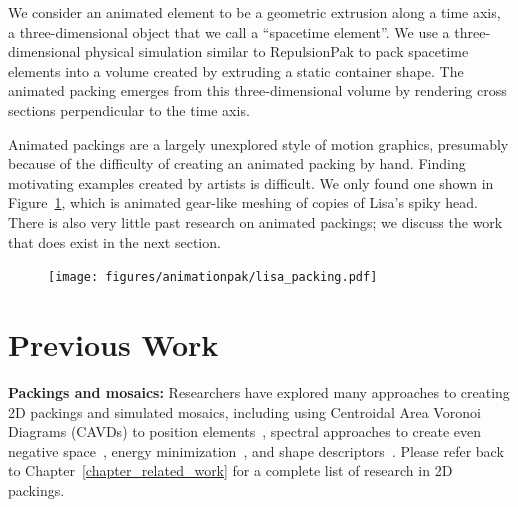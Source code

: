 We consider an animated
element to be a geometric extrusion along a time axis, a three-dimensional
object that we call a ``spacetime element''.  We use a three-dimensional physical simulation
similar to RepulsionPak to pack spacetime
elements into a volume created by extruding a static container shape.
The animated packing emerges from this three-dimensional volume by rendering 
cross sections perpendicular to the time axis.

\newtext
{
Animated packings are a largely unexplored style
of motion graphics, presumably because of the difficulty of creating 
an animated packing by hand.  
Finding motivating examples created by artists is difficult.
We only found one shown in Figure~\ref{fig_animationpak_lisa_packing},
which is animated gear-like meshing of copies of Lisa's spiky head.
There is also very little past research
on animated packings; we discuss the work that does exist in the next
section. 
}

\begin{figure}[t]
\centering
\texttt{[image: figures/animationpak/lisa\_packing.pdf]} 
\caption[An animated packing of Lisas from The Simpsons.]
{\label{fig_animationpak_lisa_packing} 
}
\end{figure}

\section{Previous Work}
\label{animationpak_previous_work}


\textbf{Packings and mosaics:} 
Researchers have explored many approaches to creating 2D packings and
simulated mosaics, including using Centroidal Area Voronoi Diagrams (CAVDs) to
position elements~\cite{Hausner2001,Hiller2003,Smith2005}, spectral
approaches to create even negative space~\cite{Dalal2006}, energy
minimization~\cite{Kim2002}, and shape descriptors~\cite{Kwan2016}.
Please refer back to Chapter~\ref{chapter_related_work} 
for a complete list of research in 2D packings.

